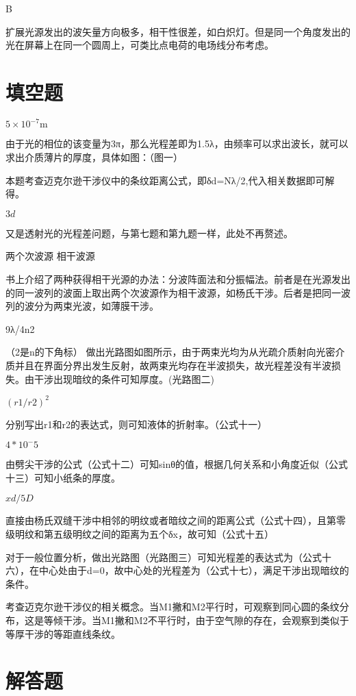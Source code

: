 \exercise B

\solve 扩展光源发出的波矢量方向极多，相干性很差，如白炽灯。但是同一个角度发出的光在屏幕上在同一个圆周上，可类比点电荷的电场线分布考虑。
\section{填空题}
\exercise $5\times10^{-7}\mathrm{m}$ 

\solve 由于光的相位的该变量为3π，那么光程差即为1.5λ，由频率可以求出波长，就可以求出介质薄片的厚度，具体如图：（图一）


\solve 本题考查迈克尔逊干涉仪中的条纹距离公式，即δd=Nλ/2,代入相关数据即可解得。

\exercise $3d$

\solve  又是透射光的光程差问题，与第七题和第九题一样，此处不再赘述。

\exercise 两个次波源 \quad 相干波源 

\solve 书上介绍了两种获得相干光源的办法：分波阵面法和分振幅法。前者是在光源发出的同一波列的波面上取出两个次波源作为相干波源，如杨氏干涉。后者是把同一波列的波分为两束光波，如薄膜干涉。

\exercise 9λ/4n2

\solve （2是n的下角标） 做出光路图如图所示，由于两束光均为从光疏介质射向光密介质并且在界面分界出发生反射，故两束光均存在半波损失，故光程差没有半波损失。由干涉出现暗纹的条件可知厚度。(光路图二)

\exercise $(r1/r2)^2$

\solve 分别写出r1和r2的表达式，则可知液体的折射率。（公式十一）

\exercise $4*10^-5$

\solve 由劈尖干涉的公式（公式十二）可知sinθ的值，根据几何关系和小角度近似（公式十三）可知小纸条的厚度。

\exercise $xd/5D$

\solve 直接由杨氏双缝干涉中相邻的明纹或者暗纹之间的距离公式（公式十四），且第零级明纹和第五级明纹之间的距离为五个δx，故可知（公式十五）

\exercise 

\solve 对于一般位置分析，做出光路图（光路图三）可知光程差的表达式为（公式十六），在中心处由于d=0，故中心处的光程差为（公式十七），满足干涉出现暗纹的条件。

\exercise 

\solve 考查迈克尔逊干涉仪的相关概念。当M1撇和M2平行时，可观察到同心圆的条纹分布，这是等倾干涉。当M1撇和M2不平行时，由于空气隙的存在，会观察到类似于等厚干涉的等距直线条纹。

\section{解答题}